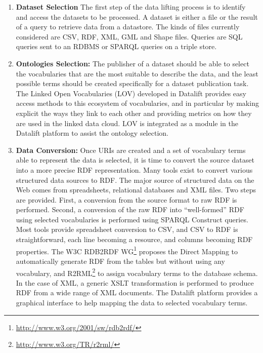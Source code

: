 \begin{enumerate}
\item{\textbf{Dataset Selection}}
The first step of the data lifting process is to identify and access the datasets to be processed. A dataset is either a file or the result of a query to retrieve data from a datastore. The kinds of files currently considered are CSV, RDF, XML, GML and Shape files. Queries are SQL queries sent to an RDBMS or SPARQL queries on a triple store.

\item {\textbf{Ontologies Selection:}}
The publisher of a dataset should be able to select the vocabularies that are the most suitable to describe the data, and the least possible terms should be created specifically for a dataset publication task. The Linked Open Vocabularies \cite{lov11} (LOV) developed in Datalift provides easy access methods to this ecosystem of vocabularies, and in particular by making explicit the ways they link to each other and providing metrics on how they are used in the linked data cloud. LOV is integrated as a module in the Datalift platform to assist the ontology selection.

\item{\textbf{Data Conversion:}}
Once URIs are created and a set of vocabulary terms able to represent the data is selected, it is time to convert the source dataset into a more precise RDF representation. Many tools exist to convert various structured data sources to RDF. The major source of structured data on the Web comes from spreadsheets, relational databases and XML files. Two steps are provided. First, a conversion from the source format to raw RDF is performed. Second, a conversion of the raw RDF into ``well-formed'' RDF using selected vocabularies is performed using SPARQL Construct queries. Most tools provide spreadsheet conversion to CSV, and CSV to RDF is straightforward, each line becoming a resource, and columns becoming RDF properties. The W3C RDB2RDF WG\footnote{\url{http://www.w3.org/2001/sw/rdb2rdf/}} proposes the Direct Mapping to automatically generate RDF from the tables but without using any vocabulary, and R2RML\footnote{\url{http://www.w3.org/TR/r2rml/}}  to assign vocabulary terms to the database schema. In the case of XML, a generic XSLT transformation is performed to produce RDF from a wide range of XML documents. The Datalift platform provides a graphical interface to help mapping the data to selected vocabulary terms.


\end{enumerate}
